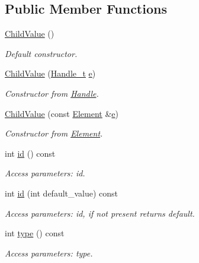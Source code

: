 \subsection*{Public Member Functions}
\begin{DoxyCompactItemize}
\item 
\hyperlink{struct_d_d4hep_1_1_x_m_l_1_1_child_value_aa23bcc094d5069317c5e0dba4e0007ce}{Child\+Value} ()
\begin{DoxyCompactList}\small\item\em Default constructor. \end{DoxyCompactList}\item 
\hyperlink{struct_d_d4hep_1_1_x_m_l_1_1_child_value_af223fea6d4d6b08ac0cb655f22e8e2b0}{Child\+Value} (\hyperlink{class_d_d4hep_1_1_x_m_l_1_1_handle__t}{Handle\+\_\+t} \hyperlink{_volumes_8cpp_a8a9a1f93e9b09afccaec215310e64142}{e})
\begin{DoxyCompactList}\small\item\em Constructor from \hyperlink{class_d_d4hep_1_1_handle}{Handle}. \end{DoxyCompactList}\item 
\hyperlink{struct_d_d4hep_1_1_x_m_l_1_1_child_value_a1295821eee0759c3d9617408b40aedac}{Child\+Value} (const \hyperlink{class_d_d4hep_1_1_x_m_l_1_1_element}{Element} \&\hyperlink{_volumes_8cpp_a8a9a1f93e9b09afccaec215310e64142}{e})
\begin{DoxyCompactList}\small\item\em Constructor from \hyperlink{class_d_d4hep_1_1_x_m_l_1_1_element}{Element}. \end{DoxyCompactList}\item 
int \hyperlink{struct_d_d4hep_1_1_x_m_l_1_1_child_value_a6a191b1198bc401dd8ce753d705edd88}{id} () const
\begin{DoxyCompactList}\small\item\em Access parameters\+: id. \end{DoxyCompactList}\item 
int \hyperlink{struct_d_d4hep_1_1_x_m_l_1_1_child_value_aecc4c7b147564d52ce9715b83963ee69}{id} (int default\+\_\+value) const
\begin{DoxyCompactList}\small\item\em Access parameters\+: id, if not present returns default. \end{DoxyCompactList}\item 
int \hyperlink{struct_d_d4hep_1_1_x_m_l_1_1_child_value_a06a0d48b995b3d169584a35c939984b8}{type} () const
\begin{DoxyCompactList}\small\item\em Access parameters\+: type. \end{DoxyCompactList}\item 

\end{DoxyCompactItemize}
